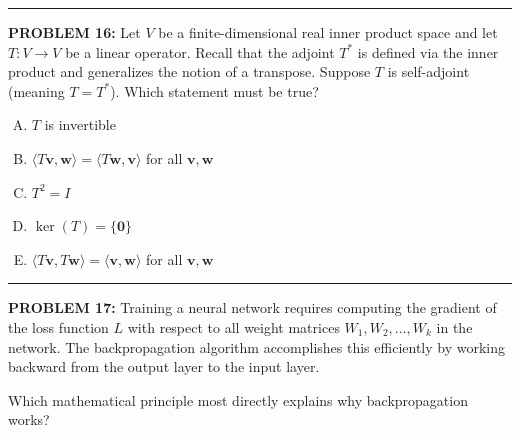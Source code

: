 \documentclass[12pt]{amsart}
\newcommand{\divider}{
  \vspace{-1em} %
  \noindent
  \raisebox{-0.15ex}{\textbullet}%
  \hspace{0.5em}%
  \rule[0.5ex]{0.95\textwidth}{1.0pt}%
  \hspace{0.5em}%
  \raisebox{-0.15ex}{\textbullet}%
  \vspace{0em} %
}
\begin{document}
{\divider

\newpage


{\bf PROBLEM 16:}
% 
Let $V$ be a finite-dimensional real inner product space and let $T: V \to V$ be a linear operator. 
Recall that the adjoint $T^*$ is defined via the inner product and generalizes the notion of a transpose.
%
Suppose $T$ is self-adjoint (meaning $T = T^*$). Which statement must be true?

\begin{enumerate}[(A)]
\item $T$ is invertible
\item $\langle T\mathbf{v}, \mathbf{w} \rangle = \langle T\mathbf{w}, \mathbf{v} \rangle$ for all $\mathbf{v}, \mathbf{w}$
\item $T^2 = I$
\item $\ker(T) = \{\mathbf{0}\}$
\item $\langle T\mathbf{v}, T\mathbf{w} \rangle = \langle \mathbf{v}, \mathbf{w} \rangle$ for all $\mathbf{v}, \mathbf{w}$
\end{enumerate}


\divider



{\bf PROBLEM 17:}
%
Training a neural network requires computing the gradient of the loss function $L$ with respect to all weight matrices $W_1, W_2, \ldots, W_k$ in the network. The backpropagation algorithm accomplishes this efficiently by working backward from the output layer to the input layer.

Which mathematical principle most directly explains why backpropagation works?

}
\end{document}
